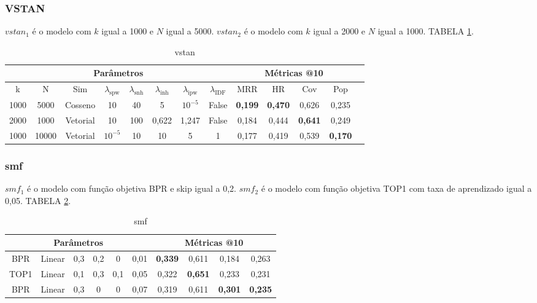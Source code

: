 \subsubsection{VSTAN}
$vstan_1$ é o modelo com $k$ igual a 1000 e $N$ igual a 5000. 
$vstan_2$ é o modelo com $k$ igual a 2000 e $N$ igual a 1000. TABELA \ref{app:vstan}.


\begin{table}[htbp]
    \centering
    \begin{tabular}{|c|c|c|c|c|c|c|c|c|c|c|c|c|}
      \hline
      \multicolumn{8}{|c|}{Parâmetros} & \multicolumn{4}{c|}{Métricas @10} \\
      \hline
      k & N & Sim & $\lambda_{\text{spw}}$ & $\lambda_{\text{snh}}$ & $\lambda_{\text{inh}}$ & $\lambda_{\text{ipw}}$ & $\lambda_{\text{IDF}}$ & MRR & HR & Cov & Pop \\
      \hline
      1000 & 5000 & Cosseno & 10 & 40 & 5 & $10^{-5}$ & False & \textbf{0,199} & \textbf{0,470} & 0,626 & 0,235 \\
      \hline
      2000 & 1000 & Vetorial & 10 & 100 & 0,622 & 1,247 & False & 0,184 & 0,444 & \textbf{0,641} & 0,249 \\
      \hline
      1000 & 10000 & Vetorial & $10^{-5}$ & 10 & 10 & 5 & 1 & 0,177 & 0,419 & 0,539 & \textbf{0,170} \\
      \hline
    \end{tabular}
    \caption{vstan}
    \label{app:vstan}
  \end{table}

\subsubsection{smf}
$smf_{1}$ é o modelo com função objetiva BPR e skip igual a 0,2.
$smf_{2}$ é o modelo com função objetiva TOP1 com taxa de aprendizado igual a 0,05.
TABELA \ref{app:smf}.
\begin{table}[htbp]
  \centering
  \begin{tabular}{|c|c|c|c|c|c|c|c|c|c|}
    \hline
      \multicolumn{6}{|c|}{Parâmetros} & \multicolumn{4}{c|}{Métricas @10} \\
      \hline
      BPR & Linear & 0,3 & 0,2 & 0 & 0,01 & \textbf{0,339} & 0,611 & 0,184 & 0,263 \\
      \hline
      TOP1 & Linear & 0,1 & 0,3 & 0,1 & 0,05 & 0,322 & \textbf{0,651} & 0,233 & 0,231 \\
      \hline
      BPR & Linear & 0,3 & 0 & 0 & 0,07 & 0,319 & 0,611 & \textbf{0,301} & \textbf{0,235} \\
      \hline
      \end{tabular}
      \caption{smf}
      \label{app:smf}
    \end{table}

